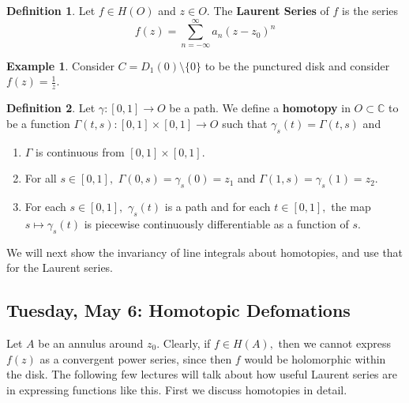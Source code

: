\documentclass[10pt, oneside]{article}
\newcommand{\bbC}{\mathbb{C}}
\newcommand{\sm}{\setminus}
\theoremstyle{definition}
\newtheorem{exmp}{Example}[section]
\newtheorem{defn}{Definition}
\newcommand{\bbC}{\mathbb{C}}
\newcommand{\sm}{\setminus}
\begin{document}
\begin{defn}
Let $f\in H(O)$ and $z\in O.$ The \textbf{Laurent Series} of $f$ is the series
    \[f(z) = \sum_{n=-\infty}^\infty a_n (z - z_0)^n\]
\end{defn}
\begin{exmp}
    Consider $C = D_1(0)\sm \{0\}$ to be the punctured disk and consider $f(z) = \frac{1}{z}.$
\end{exmp}
\begin{defn}
Let $\gamma:[0,1] \to O$ be a path.
    We define a \textbf{homotopy} in $O \subset \bbC$ to be a function $\Gamma(t,s) : [0,1] \times [0,1] \to O$ such that $\gamma_s(t) = \Gamma(t,s)$ and
    \begin{enumerate}
        \item $\Gamma$ is continuous from $[0,1]\times [0,1].$
        \item For all $s\in [0,1],$ $\Gamma(0,s) = \gamma_s(0) = z_1$ and $\Gamma(1,s) = \gamma_s(1) = z_2.$
        \item For each $s\in [0,1],$ $\gamma_s(t)$ is a path and for each $t\in [0,1],$ the map $s\mapsto \gamma_s(t)$ is piecewise continuously differentiable as a function of $s.$
    \end{enumerate}
\end{defn}

We will next show the invariancy of line integrals about homotopies, and use that for the Laurent series. 


\newpage
\subsection{Tuesday, May 6: Homotopic Defomations}
Let $A$ be an annulus around $z_0.$ Clearly, if $f \in H(A),$ then we cannot express $f(z)$ as a convergent power series, since then $f$ would be holomorphic within the disk. The following few lectures will talk about how useful Laurent series are in expressing functions like this. First we discuss homotopies in detail.
\end{document}
